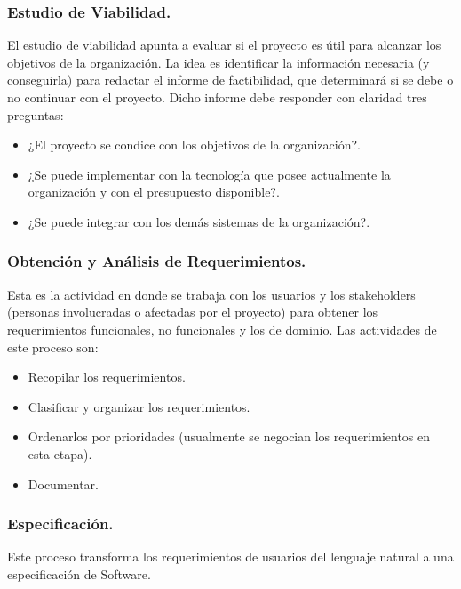 \documentclass[12pt]{beamer}
\begin{document}
\begin{frame}
\frametitle{Estudio de Viabilidad.}
El estudio de viabilidad apunta a evaluar si el proyecto es útil para alcanzar los objetivos de la organización.
La idea es identificar la información necesaria (y conseguirla) para redactar el informe de factibilidad, que determinará si se debe o no continuar con el proyecto. Dicho informe debe responder con claridad tres preguntas:
\begin{itemize}
 \item<2-> ¿El proyecto se condice con los objetivos de la organización?.
 \item<3-> ¿Se puede implementar con la tecnología que posee actualmente la organización y con el presupuesto disponible?.
 \item<4-> ¿Se puede integrar con los demás sistemas de la organización?.
\end{itemize}
\end{frame}


\begin{frame}
\frametitle{Obtención y Análisis de Requerimientos.}

Esta es la actividad en donde se trabaja con los usuarios y los stakeholders (personas involucradas o afectadas por el proyecto) para obtener los requerimientos funcionales, no funcionales y los de dominio. Las actividades de este proceso son:
\begin{itemize}
 \item<2-> Recopilar los requerimientos.
 \item<3-> Clasificar y organizar los requerimientos.
 \item<4-> Ordenarlos por prioridades (usualmente se negocian los requerimientos en esta etapa).
 \item<5-> Documentar.
\end{itemize}
\end{frame}


\begin{frame}
\frametitle{Especificación.}
Este proceso transforma los requerimientos de usuarios del lenguaje natural a una especificación de Software.
\end{frame}
\end{document}
